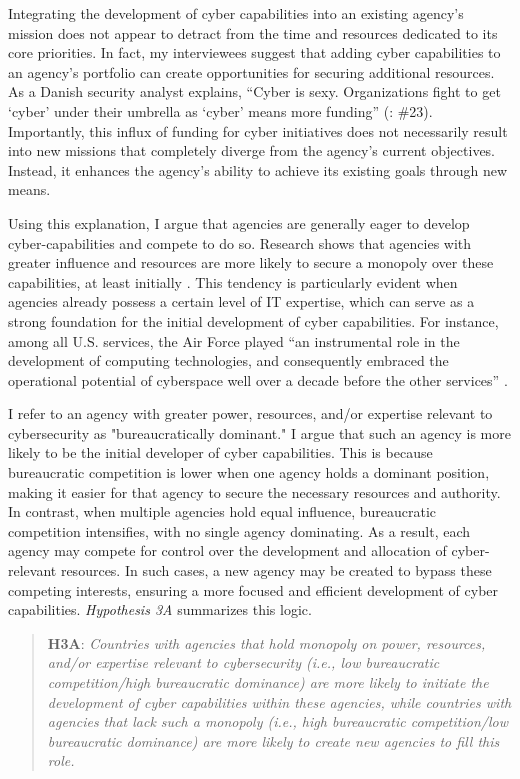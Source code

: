 \documentclass[12pt, letterpaper]{article}
\theoremstyle{plain}
\theoremstyle{remark}
\begin{document}
Integrating the development of cyber capabilities into an existing agency's mission does not appear to detract from the time and resources dedicated to its core priorities. In fact, my interviewees suggest that adding cyber capabilities to an agency’s portfolio can create opportunities for securing additional resources. As a Danish security analyst explains, “Cyber is sexy. Organizations fight to get ‘cyber’ under their umbrella as ‘cyber’ means more funding”  (\citealp{interviews2019}: \#23). Importantly, this influx of funding for cyber initiatives does not necessarily result into new missions that completely diverge from the agency's current objectives. Instead, it enhances the agency's ability to achieve its existing goals through new means.


Using this explanation, I argue that agencies are generally eager to develop cyber-capabilities and compete to do so. Research shows that agencies with greater influence and resources are more likely to secure a monopoly over these capabilities, at least initially \citep{kaplan2016dark}. This tendency is particularly evident when agencies already possess a certain level of IT expertise, which can serve as a strong foundation for the initial development of cyber capabilities.
For instance, among all U.S. services, the Air Force played ``an instrumental role in the development of computing technologies, and consequently embraced the operational potential of cyberspace well over a decade before the other services'' \citep[170]{White2019}.


I refer to an agency with greater power, resources, and/or expertise relevant to cybersecurity as "bureaucratically dominant." I argue that such an agency is more likely to be the initial developer of cyber capabilities. This is because bureaucratic competition is lower when one agency holds a dominant position, making it easier for that agency to secure the necessary resources and authority. In contrast, when multiple agencies hold equal influence, bureaucratic competition intensifies, with no single agency dominating. As a result, each agency may compete for control over the development and allocation of cyber-relevant resources. In such cases, a new agency may be created to bypass these competing interests, ensuring a more focused and efficient development of cyber capabilities.
\textit{Hypothesis 3A} summarizes this logic.

\begin{quote}
	\textbf{H3A}:
	\textit{Countries with agencies that hold monopoly on  power, resources, and/or expertise relevant to cybersecurity (i.e., low bureaucratic competition/high bureaucratic dominance) are more likely to initiate the development of cyber capabilities within these agencies, while countries with agencies that lack such a monopoly (i.e., high bureaucratic competition/low bureaucratic dominance) are more likely to create new agencies to fill this role.}
\end{quote}
\end{document}
